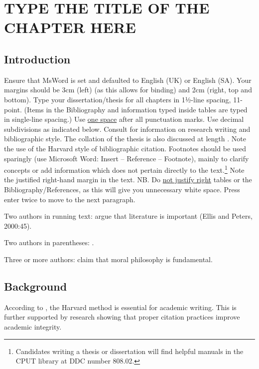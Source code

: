 
\chapter{TYPE THE TITLE OF THE CHAPTER HERE}

\section{Introduction}

Ensure that MsWord is set and defaulted to English (UK) or English (SA). Your margins should be 3cm (left) (as this allows for binding) and 2cm (right, top and bottom). Type your dissertation/thesis for all chapters in 1½-line spacing, 11-point. (Items in the Bibliography and information typed inside tables are typed in single-line spacing.) Use \underline{one space} after all punctuation marks. Use decimal subdivisions as indicated below. Consult \textcite{welman-etal-2005} for information on research writing and bibliographic style. The collation of the thesis is also discussed at length \parencite{waghid-2018}. Note the use of the Harvard style of bibliographic citation. Footnotes should be used sparingly (use Microsoft Word: Insert -- Reference -- Footnote), mainly to clarify concepts or add information which does not pertain directly to the text.\footnote{Candidates writing a thesis or dissertation will find helpful manuals in the CPUT library at DDC number 808.02.} Note the justified right-hand margin in the text. NB. Do \underline{not justify right} tables or the Bibliography/References, as this will give you unnecessary white space. Press enter twice to move to the next paragraph.

Two authors in running text: \textcite{ellis-peters-2000} argue that literature is important (Ellis and Peters, 2000:45).

Two authors in parentheses: \parencite[45]{ellis-peters-2000}.

Three or more authors: \textcite{henderson-etal-1987} claim that moral philosophy is fundamental.

\section{Background}

According to \textcite{kioko-etal-2003}, the Harvard method is essential 
for academic writing. This is further supported by research showing that 
\parencite[45]{ellis-peters-2000} proper citation practices improve 
academic integrity.

